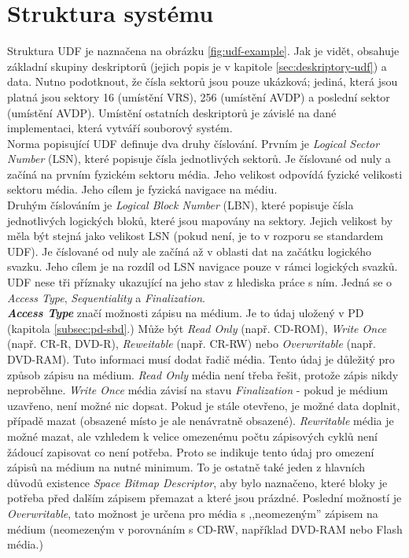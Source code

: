 \section{Struktura systému}
\label{sec:udf-struktura}
Struktura UDF je naznačena na obrázku \ref{fig:udf-example}. Jak je vidět, obsahuje základní skupiny deskriptorů (jejich popis je v kapitole \ref{sec:deskriptory-udf}) a data. Nutno podotknout, že čísla sektorů jsou pouze ukázková; jediná, která jsou platná jsou sektory 16 (umístění VRS), 256 (umístění AVDP) a poslední sektor (umístění AVDP). Umístění ostatních deskriptorů je závislé na dané implementaci, která vytváří souborový systém.\\ 
Norma popisující UDF definuje dva druhy číslování. Prvním je \textit{Logical Sector Number} (LSN), které popisuje čísla jednotlivých sektorů. Je číslované od nuly a začíná na prvním fyzickém sektoru média. Jeho velikost odpovídá fyzické velikosti sektoru média. Jeho cílem je fyzická navigace na médiu.\\
Druhým číslováním je \textit{Logical Block Number} (LBN), které popisuje čísla jednotlivých logických bloků, které jsou mapovány na sektory. Jejich velikost by měla být stejná jako velikost LSN (pokud není, je to v rozporu se standardem UDF). Je číslované od nuly ale začíná až v oblasti dat na začátku logického svazku. Jeho cílem je na rozdíl od LSN navigace pouze v rámci logických svazků.\\
UDF nese tři příznaky ukazující na jeho stav z hlediska práce s ním. Jedná se o \textit{Access Type}, \textit{Sequentiality} a \textit{Finalization}.\\
\textbf{\textit{Access Type}} značí možnosti zápisu na médium. Je to údaj uložený v PD (kapitola \ref{subsec:pd-sbd}.) Může být \textit{Read Only} (např. CD-ROM), \textit{Write Once} (např. CR-R, DVD-R), \textit{Reweitable} (např. CR-RW) nebo \textit{Overwritable} (např. DVD-RAM). Tuto informaci musí dodat řadič média. Tento údaj je důležitý pro způsob zápisu na médium. \textit{Read Only} média není třeba řešit, protože zápis nikdy neproběhne. \textit{Write Once} média závisí na stavu \textit{Finalization} - pokud je médium uzavřeno, není možné nic dopsat. Pokud je stále otevřeno, je možné data doplnit, případě mazat (obsazené místo je ale nenávratně obsazené). \textit{Rewritable} média je možné mazat, ale vzhledem k velice omezenému počtu zápisových cyklů není žádoucí zapisovat co není potřeba. Proto se indikuje tento údaj pro omezení zápisů na médium na nutné minimum. To je ostatně také jeden z hlavních důvodů existence \textit{Space Bitmap Descriptor}, aby bylo naznačeno, které bloky je potřeba před dalším zápisem přemazat a které jsou prázdné. Poslední možností je \textit{Overwritable}, tato možnost je určena pro média s ,,neomezeným'' zápisem na médium (neomezeným v porovnáním s CD-RW, například DVD-RAM nebo Flash média.)\\
